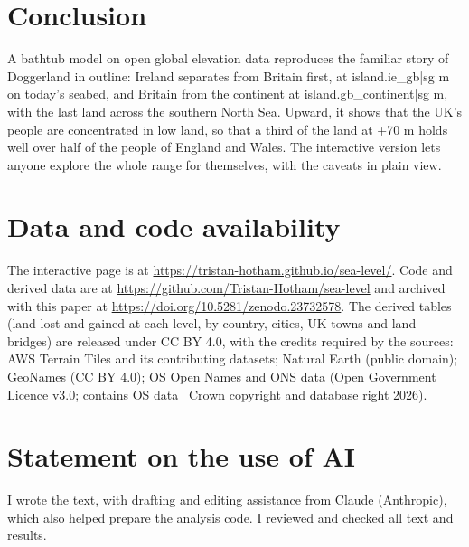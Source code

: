 \documentclass[11pt,a4paper]{article}
\begin{document}
\section{Conclusion}

A bathtub model on open global elevation data reproduces the familiar story of Doggerland in outline: Ireland separates from Britain first, at {{island.ie_gb|sg}} m on today's seabed, and Britain from the continent at {{island.gb_continent|sg}} m, with the last land across the southern North Sea. Upward, it shows that the UK's people are concentrated in low land, so that a third of the land at +70 m holds well over half of the people of England and Wales. The interactive version lets anyone explore the whole range for themselves, with the caveats in plain view.

\section*{Data and code availability}

The interactive page is at \url{https://tristan-hotham.github.io/sea-level/}. Code and derived data are at \url{https://github.com/Tristan-Hotham/sea-level} and archived with this paper at \url{https://doi.org/10.5281/zenodo.23732578}. The derived tables (land lost and gained at each level, by country, cities, UK towns and land bridges) are released under CC BY 4.0, with the credits required by the sources: AWS Terrain Tiles and its contributing datasets; Natural Earth (public domain); GeoNames (CC BY 4.0); OS Open Names and ONS data (Open Government Licence v3.0; contains OS data \textcopyright\ Crown copyright and database right 2026).

\section*{Statement on the use of AI}

I wrote the text, with drafting and editing assistance from Claude (Anthropic), which also helped prepare the analysis code. I reviewed and checked all text and results.
\end{document}
